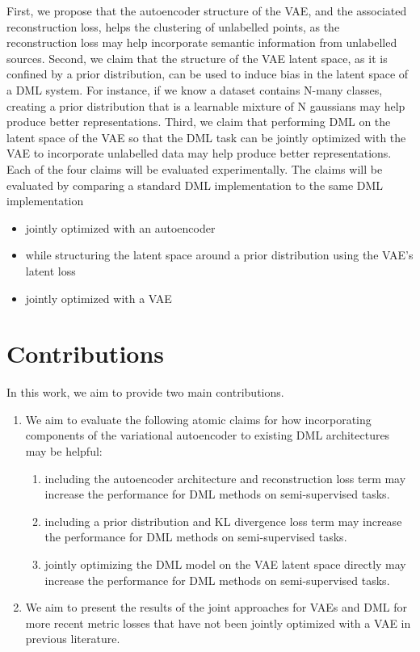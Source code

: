 \documentclass[./dissertation.tex]{subfiles}
\begin{document}
    First, we propose that the autoencoder structure of the VAE, and the associated reconstruction loss, helps the clustering of unlabelled points, as the reconstruction loss may help incorporate semantic information from unlabelled sources. Second, we claim that the structure of the VAE latent space, as it is confined by a prior distribution, can be used to induce bias in the latent space of a DML system. For instance, if we know a dataset contains N-many classes, creating a prior distribution that is a learnable mixture of N gaussians may help produce better representations. Third, we claim that performing DML on the latent space of the VAE so that the DML task can be jointly optimized with the VAE to incorporate unlabelled data may help produce better representations. \\
    
    Each of the four claims will be evaluated experimentally. The claims will be evaluated by comparing a standard DML implementation to the same DML implementation
    \begin{itemize}
        \item jointly optimized with an autoencoder
        \item while structuring the latent space around a prior distribution using the VAE’s latent loss
        \item jointly optimized with a VAE
    \end{itemize}

    \section{Contributions}
    In this work, we aim to provide two main contributions. 
    \begin{enumerate}
        \item We aim to evaluate the following atomic claims for how incorporating components of the variational autoencoder to existing DML architectures may be helpful:
        \begin{enumerate}
            \item including the autoencoder architecture and reconstruction loss term may increase the performance for DML methods on semi-supervised tasks.
            \item including a prior distribution and KL divergence loss term may increase the performance for DML methods on semi-supervised tasks.
            \item jointly optimizing the DML model on the VAE latent space directly may increase the performance for DML methods on semi-supervised tasks.
        \end{enumerate}
        \item We aim to present the results of the joint approaches for VAEs and DML for more recent metric losses that have not been jointly optimized with a VAE in previous literature. 
    \end{enumerate}
\end{document}
